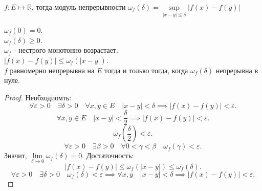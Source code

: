 \documentclass[11pt, oneside]{article}   	%
\begin{document}
    \begin{definition}
        $f: E \mapsto \mathbb{R}$, тогда модуль непрерывности $\omega_{f}(\delta) = \sup\limits_{|x-y| \le \delta} |f(x)-f(y)|$
    \end{definition}
    \begin{dlemma}
        $\omega_{f}(0) = 0$.\\
        $\omega_{f}(\delta) \ge  0$.\\
        $\omega_{f}$ - нестрого монотонно возрастает.\\
        $|f(x)-f(y)| \le \omega_{f}(|x-y|)$.\\
        $f$ равномерно непрерывна на $E$ тогда и только тогда, когда $\omega_f(\delta)$ непрерывна в нуле.
        \begin{proof}
            Необходиомть:
            \[ \forall{\varepsilon > 0}\quad \exists{\delta > 0}\quad \forall{x, y\in E}\quad |x-y| < \delta \implies |f(x) - f(y)| < \varepsilon .\]
            \[ \forall{x, y\in E}\quad |x-y| < \frac{\delta}{2} \implies |f(x)-f(y)|<\varepsilon .\]
            \[ \omega_{f}\left(\frac{\delta}{2}\right) < \varepsilon  .\]
            \[ \forall{\varepsilon > 0}\quad \exists{\beta > 0}\quad \forall{0 < \gamma < \beta}\quad \omega_{f}(\gamma) < \varepsilon .\]
            Значит, $\lim\limits_{\delta \to 0} \omega_f(\delta) = 0$.
            Достаточность:
            \[ |f(x)-f(y)| \le \omega_{f}(|x-y|) \le \omega_{f}(\delta).\]
            \[ \forall{\varepsilon > 0}\quad \exists{\delta > 0}\quad \omega_{f}(\delta) < \varepsilon \implies \forall{x,y}\quad |x-y| < \delta \implies |f(x)-f(y)| < \varepsilon .\] 
        \end{proof}
    \end{dlemma}
\end{document}
